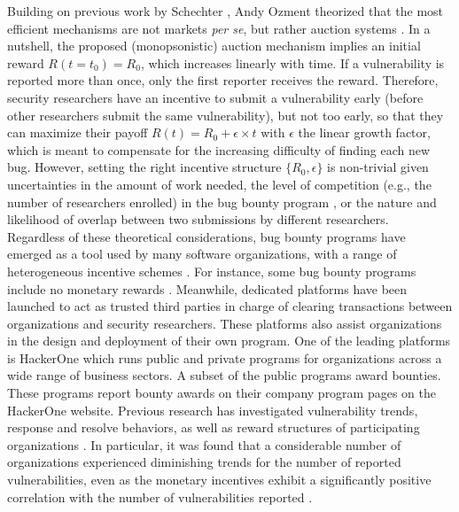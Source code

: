 Building on previous work by Schechter \cite{schechter2002buy}, Andy Ozment \cite{ozment2004bug} theorized that the most efficient mechanisms are not markets {\it per se}, but rather auction systems \cite{milgrom1982theory}. In a nutshell, the proposed (monopsonistic) auction mechanism implies an initial reward $R(t=t_0) = R_0$, which increases linearly with time. If a vulnerability is reported more than once, only the first reporter receives the reward. Therefore, security researchers have an incentive to submit a vulnerability early (before other researchers submit the same vulnerability), but not too early, so that they can maximize their payoff $R(t) = R_0 + \epsilon \times t$ with $\epsilon$ the linear growth factor, which is meant to compensate for the increasing difficulty of finding each new bug. However, setting the right incentive structure $\{R_0,\epsilon \}$ is non-trivial given uncertainties in the amount of work needed, the level of competition (e.g., the number of researchers enrolled) in the bug bounty program \cite{pandey2014assessment}, or the nature and likelihood of overlap between two submissions by different researchers.\\

Regardless of these theoretical considerations, bug bounty programs have emerged as a tool used by many software organizations, with a range of heterogeneous incentive schemes \cite{finifter2013empirical}. For instance, some bug bounty programs include no monetary rewards \cite{zhao2014exploratory}. Meanwhile, dedicated platforms have been launched to act as trusted third parties in charge of clearing transactions between organizations and security researchers. These platforms also assist organizations in the design and deployment of their own program. One of the leading platforms is HackerOne which runs public and private programs for organizations across a wide range of business sectors. A subset of the public programs award bounties. These programs report bounty awards on their company program pages on the HackerOne website. Previous research has investigated vulnerability trends, response and resolve behaviors, as well as reward structures of participating organizations \cite{zhao2014exploratory,zhao2015empirical}. In particular, it was found that a considerable number of organizations experienced diminishing trends for the number of reported vulnerabilities, even as the monetary incentives exhibit a significantly positive correlation with the number of vulnerabilities reported \cite{zhao2015empirical}.

